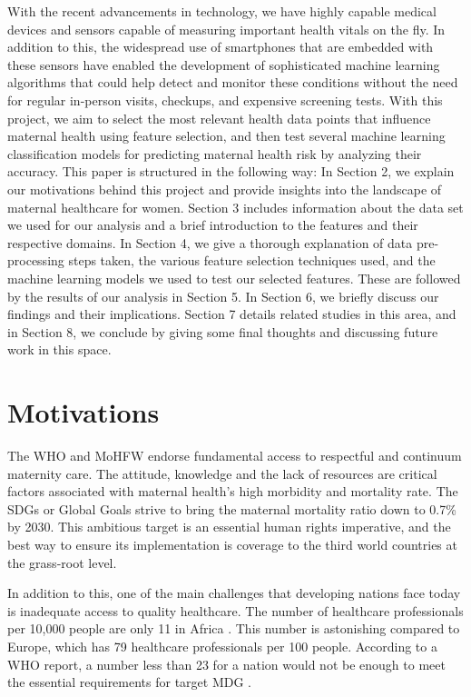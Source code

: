 \documentclass[conference]{IEEEtran}
\begin{document}
With the recent advancements in technology, we have highly capable medical devices and sensors capable of measuring important health vitals on the fly. In addition to this, the widespread use of smartphones that are embedded with these sensors have enabled the development of sophisticated machine learning algorithms that could help detect and monitor these conditions without the need for regular in-person visits, checkups, and expensive screening tests. With this project, we aim to select the most relevant health data points that influence maternal health using feature selection, and then test several machine learning classification models for predicting maternal health risk by analyzing their accuracy.
This paper is structured in the following way: In Section 2, we explain our motivations behind this project and provide insights into the landscape of maternal healthcare for women. Section 3 includes information about the data set we used for our analysis and a brief introduction to the features and their respective domains. In Section 4, we give a thorough explanation of data pre-processing steps taken, the various feature selection techniques used, and the machine learning models we used to test our selected features. These are followed by the
results of our analysis in Section 5. In Section 6, we briefly discuss our findings and their implications. Section 7 details related studies in this area, and in Section 8, we conclude by giving some final thoughts and discussing future work in this space.

\section{Motivations}
The WHO and MoHFW endorse fundamental access to respectful and continuum maternity care. The attitude, knowledge and the lack of resources are critical factors associated with maternal health's high morbidity and mortality rate. The SDGs or Global Goals strive to bring the maternal mortality ratio down to 0.7\% by 2030. This ambitious target is an essential human rights imperative, and the best way
to ensure its implementation is coverage to the third world
countries at the grass-root level.

In addition to this, one of the main challenges that developing nations face today is inadequate access to quality
healthcare. The number of healthcare professionals per 10,000
people are only 11 in Africa \cite{anand2004human}. This number is astonishing compared to Europe, which has 79 healthcare professionals per 100 people. According to a WHO report, a number less than 23 for a nation would not be enough to meet the essential requirements for target MDG \cite{worldhealthstat}.
\end{document}
